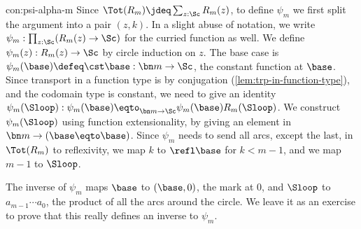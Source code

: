 \begin{implementation}{con:psi-alpha-m}
  Since $\Tot(R_m) \jdeq \sum_{z:\Sc}R_m(z)$,
  to define $\psi_m$ we first split the argument into a pair $(z,k)$.
  In a slight abuse of notation, we write $\psi_m : \prod_{z:\Sc}(R_m(z) \to \Sc)$
  for the curried function as well.
  We define $\psi_m(z) : R_m(z) \to \Sc$ by circle induction on $z$.
  The base case is $\psi_m(\base) \defeq \cst\base : \bn m \to \Sc$,
  the constant function at $\base$.
  Since transport in a function type is by conjugation
  (\cref{lem:trp-in-function-type}),
  and the codomain type is constant,
  we need to give an identity
  $\psi_m(\Sloop) : \psi_m(\base) \eqto_{\bn m\to\Sc} \psi_m(\base)R_m(\Sloop)$.
  We construct $\psi_m(\Sloop)$ using function extensionality,
  by giving an element in $\bn m\to(\base\eqto \base)$.
  Since $\psi_m$ needs to send all arcs, except the last,
  in $\Tot(R_m)$ to reflexivity,
  we map $k$ to $\refl\base$ for $k<m-1$,
  and we map $m-1$ to $\Sloop$.

  The inverse of $\psi_m$ maps $\base$ to $(\base,0)$, \ie the mark at $0$,
  and $\Sloop$ to $a_{m-1}\cdots a_0$,
  \ie the product of all the arcs around the circle.
  We leave it as an exercise to prove that this really defines an inverse to $\psi_m$.


\end{implementation}
